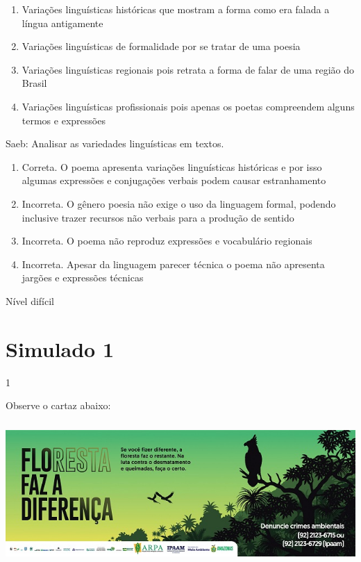 {{\begin{itemize}
\begin{itemize}
\begin{enumerate}
\def\labelenumi{\alph{enumi})}
\item
  Variações linguísticas históricas que mostram a forma como era falada
  a língua antigamente
\item
  Variações linguísticas de formalidade por se tratar de uma poesia
\item
  Variações linguísticas regionais pois retrata a forma de falar de uma
  região do Brasil
\item
  Variações linguísticas profissionais pois apenas os poetas compreendem
  alguns termos e expressões
\end{enumerate}

Saeb: Analisar as variedades linguísticas em textos.

\begin{enumerate}
\def\labelenumi{\arabic{enumi}.}
\item
  Correta. O poema apresenta variações linguísticas históricas e por
  isso algumas expressões e conjugações verbais podem causar
  estranhamento
\item
  Incorreta. O gênero poesia não exige o uso da linguagem formal,
  podendo inclusive trazer recursos não verbais para a produção de
  sentido
\item
  Incorreta. O poema não reproduz expressões e vocabulário regionais
\item
  Incorreta. Apesar da linguagem parecer técnica o poema não apresenta
  jargões e expressões técnicas
\end{enumerate}

Nível difícil

\chapter{Simulado 1}

\num{1}

Observe o cartaz abaixo:

\includegraphics[width=5.90551in,height=2.125in]{./imgSAEB_7_POR/media/image16.png}


\end{itemize}
\end{itemize}}}
